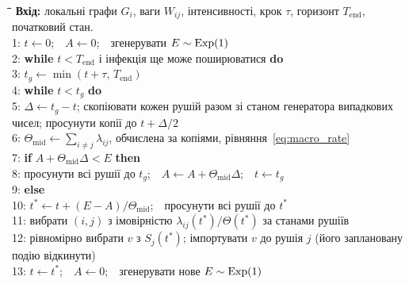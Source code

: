 \begin{algorithm}[tbp]
\caption{Сітково синхронізоване двомасштабне моделювання однієї реалізації.}
\label{alg:scheduler}
\small
\begin{tabbing}
\hspace*{1.6em}\=\hspace*{1.4em}\=\hspace*{1.4em}\=\hspace*{1.4em}\=\kill
\textbf{Вхід:} локальні графи $G_i$, ваги $W_{ij}$, інтенсивності, крок $\tau$, горизонт $T_{\mathrm{end}}$, початковий стан.\\[2pt]
1:\> $t\gets 0$;\ \ $A\gets 0$;\ \ згенерувати $E\sim\mathrm{Exp}(1)$\\
2:\> \textbf{while} $t<T_{\mathrm{end}}$ і інфекція ще може поширюватися \textbf{do}\\
3:\>\> $t_g\gets\min(t+\tau,\,T_{\mathrm{end}})$\\
4:\>\> \textbf{while} $t<t_g$ \textbf{do}\\
5:\>\>\> $\Delta\gets t_g-t$; скопіювати кожен рушій разом зі станом генератора випадкових чисел; просунути копії до $t+\Delta/2$\\
6:\>\>\> $\Theta_{\mathrm{mid}}\gets\sum_{i\neq j}\lambda_{ij}$, обчислена за копіями, рівняння~\eqref{eq:macro_rate}\\
7:\>\>\> \textbf{if} $A+\Theta_{\mathrm{mid}}\Delta<E$ \textbf{then} \\
8:\>\>\>\> просунути всі рушії до $t_g$;\ \ $A\gets A+\Theta_{\mathrm{mid}}\Delta$;\ \ $t\gets t_g$\\
9:\>\>\> \textbf{else}\\
10:\>\>\>\> $t^\ast\gets t+(E-A)/\Theta_{\mathrm{mid}}$;\ \ просунути всі рушії до $t^\ast$\\
11:\>\>\>\> вибрати $(i,j)$ з імовірністю $\lambda_{ij}(t^\ast)/\Theta(t^\ast)$ за станами рушіїв\\
12:\>\>\>\> рівномірно вибрати $v$ з $S_j(t^\ast)$; імпортувати $v$ до рушія $j$ (його заплановану подію відкинути)\\
13:\>\>\>\> $t\gets t^\ast$;\ \ $A\gets 0$;\ \ згенерувати нове $E\sim\mathrm{Exp}(1)$
\end{tabbing}
\end{algorithm}

